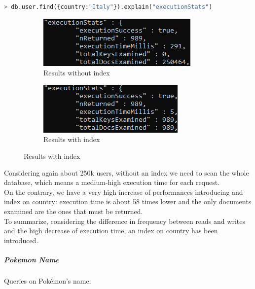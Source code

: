 \begin{lstlisting}[language=python]
	> db.user.find({country:"Italy"}).explain("executionStats")
\end{lstlisting}

\begin{figure}[H]
	\begin{subfigure}{0.5\textwidth}
		\includegraphics[width=0.9\linewidth]{img/CountryNoIndex.png} 
		\caption{Results without index}
	\end{subfigure}
	\begin{subfigure}{0.5\textwidth}
		\includegraphics[width=0.9\linewidth]{img/CountryIndex.png}
		\caption{Results with index}
	\end{subfigure}
\end{figure}

Considering again about 250k users, without an index we need to scan the whole database, which means a medium-high execution time for each request.\\
On the contrary, we have a very high increase of performances introducing and index on country: execution time is about 58 times lower and the only documents examined are the ones that must be returned.\\
To summarize, considering the difference in frequency between reads and writes and the high decrease of execution time, an index on country has been introduced.

\subparagraph{Pokemon Name}

Queries on Pokémon’s name:

